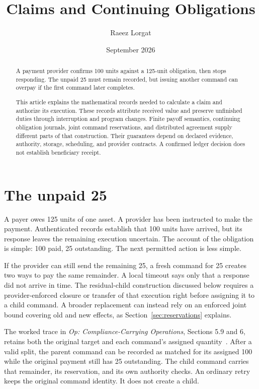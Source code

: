 \documentclass{momentum}
\title{Claims and Continuing Obligations}
\author{Raeez Lorgat}
\date{September 2026}
\begin{document}
\maketitle

\begin{abstract}
A payment provider confirms 100 units against a 125-unit obligation, then stops responding. The unpaid 25 must remain recorded, but issuing another command can overpay if the first command later completes.

This article explains the mathematical records needed to calculate a claim and authorize its execution. These records attribute received value and preserve unfinished duties through interruption and program changes. Finite payoff semantics, continuing obligation journals, joint command reservations, and distributed agreement supply different parts of that construction. Their guarantees depend on declared evidence, authority, storage, scheduling, and provider contracts. A confirmed ledger decision does not establish beneficiary receipt.
\end{abstract}

\section{The unpaid 25}
\label{sec:payment}

A payer owes 125 units of one asset. A provider has been instructed to make the payment. Authenticated records establish that 100 units have arrived, but its response leaves the remaining execution uncertain. The account of the obligation is simple: 100 paid, 25 outstanding. The next permitted action is less simple.

If the provider can still send the remaining 25, a fresh command for 25 creates two ways to pay the same remainder. A local timeout says only that a response did not arrive in time. The residual-child construction discussed below requires a provider-enforced closure or transfer of that execution right before assigning it to a child command. A broader replacement can instead rely on an enforced joint bound covering old and new effects, as Section~\ref{sec:reservations} explains.

The worked trace in \emph{Op: Compliance-Carrying Operations}, Sections 5.9 and 6, retains both the original target and each command's assigned quantity~\cite{op}. After a valid split, the parent command can be recorded as matched for its assigned 100 while the original payment still has 25 outstanding. The child command carries that remainder, its reservation, and its own authority checks. An ordinary retry keeps the original command identity. It does not create a child.
\end{document}
